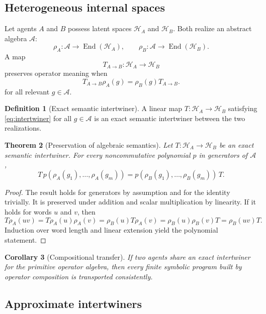 \documentclass[11pt]{article}
\newtheorem{theorem}{Theorem}[section]
\newtheorem{corollary}[theorem]{Corollary}
\theoremstyle{definition}
\newtheorem{definition}[theorem]{Definition}
\theoremstyle{remark}
\newcommand{\Lat}{\mathcal H}
\newcommand{\End}{\operatorname{End}}
\begin{document}
\subsection{Heterogeneous internal spaces}

Let agents \(A\) and \(B\) possess latent spaces \(\Lat_A\) and \(\Lat_B\). Both realize an abstract algebra \(\mathcal A\):
\[
\rho_A:\mathcal A\to\End(\Lat_A),
\qquad
\rho_B:\mathcal A\to\End(\Lat_B).
\]
A map
\[
T_{A\to B}:\Lat_A\to\Lat_B
\]
preserves operator meaning when
\begin{equation}
T_{A\to B}\rho_A(g)
=
\rho_B(g)T_{A\to B}.
\label{eq:intertwiner}
\end{equation}
for all relevant \(g\in\mathcal A\).

\begin{definition}[Exact semantic intertwiner]
A linear map \(T:\Lat_A\to\Lat_B\) satisfying \cref{eq:intertwiner} for all \(g\in\mathcal A\) is an exact semantic intertwiner between the two realizations.
\end{definition}

\begin{theorem}[Preservation of algebraic semantics]
Let \(T:\Lat_A\to\Lat_B\) be an exact semantic intertwiner. For every noncommutative polynomial \(p\) in generators of \(\mathcal A\),
\[
T\,p(\rho_A(g_1),\ldots,\rho_A(g_m))
=
p(\rho_B(g_1),\ldots,\rho_B(g_m))\,T.
\]
\end{theorem}

\begin{proof}
The result holds for generators by assumption and for the identity trivially. It is preserved under addition and scalar multiplication by linearity. If it holds for words \(u\) and \(v\), then
\[
T\rho_A(uv)
=T\rho_A(u)\rho_A(v)
=\rho_B(u)T\rho_A(v)
=\rho_B(u)\rho_B(v)T
=\rho_B(uv)T.
\]
Induction over word length and linear extension yield the polynomial statement.
\end{proof}

\begin{corollary}[Compositional transfer]
If two agents share an exact intertwiner for the primitive operator algebra, then every finite symbolic program built by operator composition is transported consistently.
\end{corollary}

\subsection{Approximate intertwiners}
\end{document}
